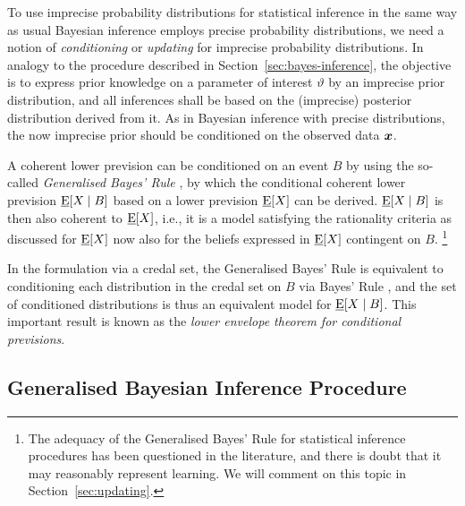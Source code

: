 To use imprecise probability distributions for statistical inference
in the same way as usual Bayesian inference employs precise probability distributions,
we need a notion of \emph{conditioning} or \emph{updating} for imprecise probability distributions.
In analogy to the procedure described in Section~\ref{sec:bayes-inference},
the objective is to express prior knowledge on a parameter of interest $\vartheta$
by an imprecise prior distribution,
and all inferences shall be based on the (imprecise) posterior distribution derived from it.
As in Bayesian inference with precise distributions,
the now imprecise prior should be conditioned on the observed data ${\bm x}$.

A coherent lower prevision can be conditioned on an event $B$
by using the so-called \emph{Generalised Bayes' Rule} \parencite[GBR,][\S 6.4]{1991:walley},
by which the conditional coherent lower prevision $\underline{\operatorname{E}}[X\mid B]$
based on a lower prevision $\underline{\operatorname{E}}[X]$ can be derived.
$\underline{\operatorname{E}}[X\mid B]$ is then also coherent to $\underline{\operatorname{E}}[X]$, i.e.,
it is a model satisfying the rationality criteria as discussed for $\underline{\operatorname{E}}[X]$
now also for the beliefs expressed in $\underline{\operatorname{E}}[X]$ contingent on $B$.%
\footnote{The adequacy of the Generalised Bayes' Rule for statistical inference procedures has been questioned in the literature,
and there is doubt that it may reasonably represent learning.
We will comment on this topic in Section~\ref{sec:updating}.}

In the formulation via a credal set, the Generalised Bayes' Rule
is equivalent to conditioning each distribution in the credal set on $B$ via Bayes' Rule
\parencite[\S 6.4.2]{1991:walley},
and the set of conditioned distributions is thus an equivalent model for $\underline{\operatorname{E}}[X\mid B]$.
This important result is known as the \emph{lower envelope theorem for conditional previsions}.


\subsection{Generalised Bayesian Inference Procedure}
\label{sec:imprecisebayes}



